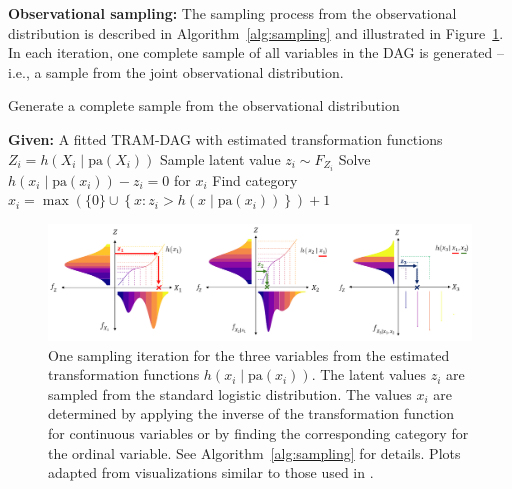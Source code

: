 \medskip

\textbf{Observational sampling:} The sampling process from the observational distribution is described in Algorithm~\ref{alg:sampling} and illustrated in Figure~\ref{fig:sampling}. In each iteration, one complete sample of all variables in the DAG is generated -- i.e., a sample from the joint observational distribution.

\begin{algorithm}
\caption{Generate a complete sample from the observational distribution}
\label{alg:sampling}
\begin{algorithmic}
\State \textbf{Given:} A fitted TRAM-DAG with estimated transformation functions $Z_i = h(X_i \mid \text{pa}(X_i))$
  \State Sample latent value $z_i \sim F_{Z_i}$ 
    \State Solve $h(x_i \mid \text{pa}(x_i)) - z_i = 0$ for $x_i$ 
    \State Find category $x_i = \max \left( \{0\} \cup \left\{ x : z_i > h(x \mid \text{pa}(x_i)) \right\} \right) + 1
$
  \EndIf
\EndFor
\end{algorithmic}
\end{algorithm}


\begin{figure}[H]  %
\centering
\includegraphics[width=1\textwidth]{img/sampling.png}
\caption{One sampling iteration for the three variables from the estimated transformation functions $h(x_i \mid \text{pa}(x_i))$. The latent values $z_i$ are sampled from the standard logistic distribution. The values $x_i$ are determined by applying the inverse of the transformation function for continuous variables or by finding the corresponding category for the ordinal variable. See Algorithm~\ref{alg:sampling} for details. Plots adapted from visualizations similar to those used in \citet{sick2025}.}
\label{fig:sampling}
\end{figure}


% 


